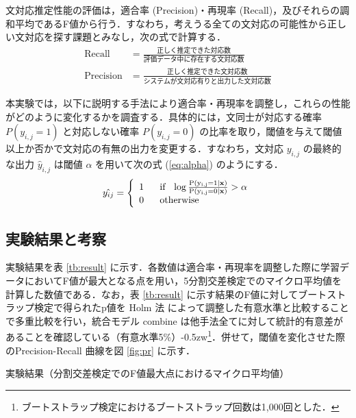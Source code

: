 \documentclass[japanese]{jnlp_1.4}
\begin{document}
文対応推定性能の評価は，適合率 (Precision)・再現率 (Recall)，及びそれらの調和平均であるF値から行う．すなわち，考えうる全ての文対応の可能性から正しい文対応を探す課題とみなし，次の式で計算する．
\pagebreak
\begin{align*}
\text{Recall} & = \frac{正しく推定できた対応数}{評価データ中に存在する文対応数} \\[0.5zw]
\text{Precision} & =  \frac{正しく推定できた文対応数}{システムが文対応有りと出力した文対応数}
\end{align*}

本実験では，以下に説明する手法により適合率・再現率を調整し，これらの性能がどのように変化するかを調査する．具体的には，文同士が対応する確率 $P(y_{i,j}=1)$ と対応しない確率 $P(y_{i,j}=0)$ の比率を取り，閾値を与えて閾値以上か否かで文対応の有無の出力を変更する．すなわち，文対応 $y_{i,j}$ の最終的な出力 $\hat{y}_{i,j}$ は閾値 $\alpha$ を用いて次の式 (\ref{eq:alpha}) のようにする．
\begin{equation} \label{eq:alpha}
  \hat{y_{ij}} = \left\{
  \begin{array}{cl}
     1 & ~~ \rm{if} ~~ \log \frac{P(y_{i,j}=1 | \mathbf{x})}{P(y_{i,j}=0 | \mathbf{x})} > \alpha \\
     0 & ~~ \rm{otherwise} \\
  \end{array}
  \right.
\end{equation}


\subsection{実験結果と考察}

実験結果を表 \ref{tb:result} に示す．各数値は適合率・再現率を調整した際に学習データにおいてF値が最大となる点を用い，5分割交差検定でのマイクロ平均値を計算した数値である．なお，表 \ref{tb:result} に示す結果のF値に対してブートストラップ検定で得られたp値を Holm 法 \cite{Holm1979} によって調整した有意水準と比較することで多重比較を行い，統合モデル combine は他手法全てに対して統計的有意差があることを確認している（有意水準5\%）{\kern-0.5zw}\footnote{ブートストラップ検定におけるブートストラップ回数は1,000回とした．}．併せて，閾値を変化させた際のPrecision-Recall 曲線を図 \ref{fig:pr} に示す．

\begin{table}[b]
  \caption{実験結果（分割交差検定でのF値最大点におけるマイクロ平均値）}
  \label{tb:result}

\vspace{-1\Cvs}
\end{table}
\end{document}
